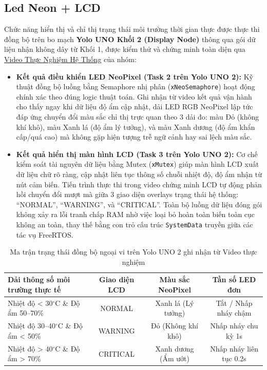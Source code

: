 \subsection{Led Neon + LCD}
Chức năng hiển thị và chỉ thị trạng thái môi trường thời gian thực được thực thi đồng bộ trên bo mạch \textbf{Yolo UNO Khối 2 (Display Node)} thông qua gói dữ liệu nhận không dây từ Khối 1, được kiểm thử và chứng minh toàn diện qua \href{https://drive.google.com/drive/folders/1CUfE8fknewNf8SvfNuVBJEifk1m3CWep?usp=sharing}{Video Thực Nghiệm Hệ Thống} của nhóm:
\begin{itemize}
    \item \textbf{Kết quả điều khiển LED NeoPixel (Task 2 trên Yolo UNO 2):} Kỹ thuật đồng bộ luồng bằng Semaphore nhị phân (\texttt{xNeoSemaphore}) hoạt động chính xác theo đúng logic thuật toán. Ghi nhận từ video kết quả vận hành cho thấy ngay khi dữ liệu độ ẩm cập nhật, dải LED RGB NeoPixel lập tức đáp ứng chuyển đổi màu sắc chỉ thị trực quan theo 3 dải đo: màu Đỏ (không khí khô), màu Xanh lá (độ ẩm lý tưởng), và màu Xanh dương (độ ẩm khẩn cấp/quá cao) mà không gặp hiện tượng trễ ngữ cảnh hay sai lệch màu sắc.
    \item \textbf{Kết quả hiển thị màn hình LCD (Task 3 trên Yolo UNO 2):} Cơ chế kiểm soát tài nguyên dữ liệu bằng Mutex (\texttt{xMutex}) giúp màn hình LCD xuất dữ liệu chữ rõ ràng, cập nhật liên tục thông số chuỗi nhiệt độ, độ ẩm nhận từ nút cảm biến. Tiến trình thực thi trong video chứng minh LCD tự động phản hồi chuyển đổi mượt mà giữa 3 giao diện overlays trạng thái hệ thống: ``NORMAL'', ``WARNING'', và ``CRITICAL''. Toàn bộ luồng dữ liệu đóng gói không xảy ra lỗi tranh chấp RAM nhờ việc loại bỏ hoàn toàn biến toàn cục không an toàn, thay thế bằng con trỏ cấu trúc \texttt{SystemData} truyền giữa các tác vụ FreeRTOS.
\end{itemize}

\begin{table}[H]
    \centering
    \caption{Ma trận trạng thái đồng bộ ngoại vi trên Yolo UNO 2 ghi nhận từ Video thực nghiệm}
    \begin{tabular}{|l|c|c|c|}
    \hline
    \textbf{Dải thông số môi trường thực tế} & \textbf{Giao diện LCD} & \textbf{Màu sắc NeoPixel} & \textbf{Tần số LED đơn} \\ \hline
    Nhiệt độ < 30$^{\circ}$C \& Độ ẩm 50--70\% & NORMAL & Xanh lá (Lý tưởng) & Tắt / Nhấp nháy chậm \\ \hline
    Nhiệt độ 30--40$^{\circ}$C \& Độ ẩm < 50\% & WARNING & Đỏ (Không khí khô) & Nhấp nháy chu kỳ 1s \\ \hline
    Nhiệt độ > 40$^{\circ}$C \& Độ ẩm > 70\% & CRITICAL & Xanh dương (Ẩm ướt) & Nhấp nháy liên tục 0.2s \\ \hline
    \end{tabular}
\end{table}

